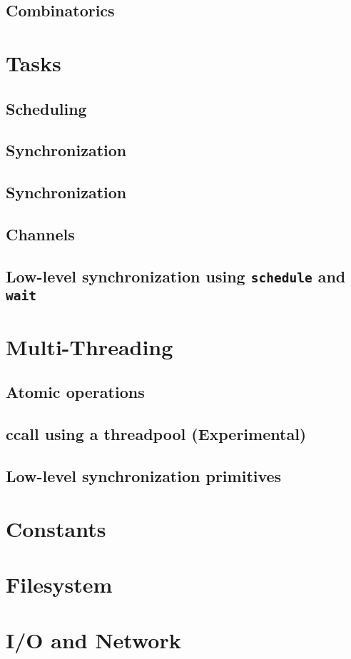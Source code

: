     \section{Combinatorics}
  \chapter{Tasks}
    \section{Scheduling}
    \section{Synchronization}
    \section{Synchronization}
    \section{Channels}
    \section{Low-level synchronization using \texttt{schedule} and \texttt{wait}}
  \chapter{Multi-Threading}
    \section{Atomic operations}
    \section{ccall using a threadpool (Experimental)}
    \section{Low-level synchronization primitives}
  \chapter{Constants}
  \chapter{Filesystem}
  \chapter{I/O and Network}
